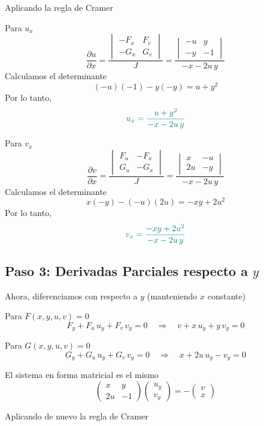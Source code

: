 \documentclass{article}
\begin{document}
Aplicando la regla de Cramer

Para \( \displaystyle u_x\)
\[
\frac{\partial u}{\partial x} =
\frac{
\begin{vmatrix}
- F_x & F_v \\
- G_x & G_v
\end{vmatrix}
}{J}
=\frac{
\begin{vmatrix}
- u & y \\
- y & -1
\end{vmatrix}
}{-x - 2u\,y}
\]
Calculamos el determinante
\[
(-u)(-1) - y(-y) = u + y^2
\]
Por lo tanto,
\[\color{teal}
u_x = \frac{u + y^2}{-x - 2u\,y}
\]

Para \( \displaystyle v_x\)
\[
\frac{\partial v}{\partial x} =
\frac{
\begin{vmatrix}
F_u & - F_x \\
G_u & - G_x
\end{vmatrix}
}{J}
=\frac{
\begin{vmatrix}
x & - u \\
2u & - y
\end{vmatrix}
}{-x - 2u\,y}
\]
Calculamos el determinante
\[
x(-y) - (-u)(2u) = -xy + 2u^2
\]
Por lo tanto,
\[\color{teal}
v_x = \frac{-xy + 2u^2}{-x - 2u\,y}
\]

\subsection*{Paso 3: Derivadas Parciales respecto a \(y\)}

Ahora, diferenciamos con respecto a \(y\) (manteniendo \(x\) constante)

Para \(F(x,y,u,v)=0\)
\[
F_y + F_u\,u_y + F_v\,v_y = 0 \quad \Longrightarrow \quad v + x\,u_y + y\,v_y = 0
\]

Para \(G(x,y,u,v)=0\)
\[
G_y + G_u\,u_y + G_v\,v_y = 0 \quad \Longrightarrow \quad x + 2u\,u_y - v_y = 0
\]

El sistema en forma matricial es el mismo
\[
\begin{pmatrix}
x & y \\
2u & -1
\end{pmatrix}
\begin{pmatrix}
u_y \\[3mm] v_y
\end{pmatrix}
=
-\begin{pmatrix}
v \\[3mm] x
\end{pmatrix}
\]

Aplicando de nuevo la regla de Cramer
\end{document}
